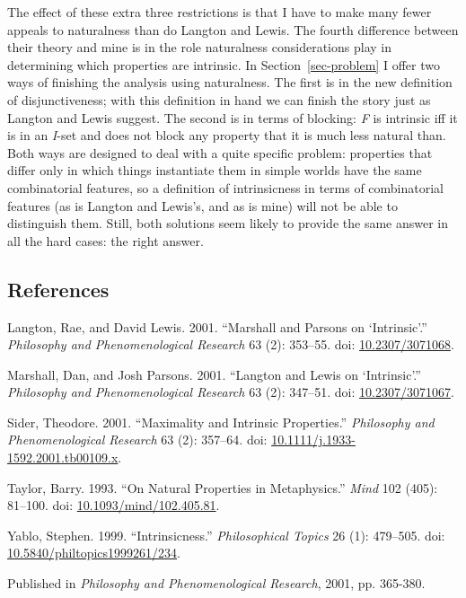 \documentclass[
  11pt,
  letterpaper,
  DIV=11,
  numbers=noendperiod,
  twoside]{scrartcl}
\newlength{\cslhangindent}
\newenvironment{CSLReferences}[2] %
 {\begin{list}{}{%
  \setlength{\itemindent}{0pt}
  \setlength{\leftmargin}{0pt}
  \setlength{\parsep}{0pt}
  \ifodd #1
   \setlength{\leftmargin}{\cslhangindent}
   \setlength{\itemindent}{-1\cslhangindent}
  \fi
  \setlength{\itemsep}{#2\baselineskip}}}
 {\end{list}}
\begin{document}
The effect of these extra three restrictions is that I have to make many
fewer appeals to naturalness than do Langton and Lewis. The fourth
difference between their theory and mine is in the role naturalness
considerations play in determining which properties are intrinsic. In
Section~\ref{sec-problem} I offer two ways of finishing the analysis
using naturalness. The first is in the new definition of
disjunctiveness; with this definition in hand we can finish the story
just as Langton and Lewis suggest. The second is in terms of blocking:
\emph{F} is intrinsic iff it is in an \emph{I}-set and does not block
any property that it is much less natural than. Both ways are designed
to deal with a quite specific problem: properties that differ only in
which things instantiate them in simple worlds have the same
combinatorial features, so a definition of intrinsicness in terms of
combinatorial features (as is Langton and Lewis's, and as is mine) will
not be able to distinguish them. Still, both solutions seem likely to
provide the same answer in all the hard cases: the right answer.

\subsection*{References}\label{references}

\label{refs}
\begin{CSLReferences}{1}{0}
Langton, Rae, and David Lewis. 2001. {``Marshall and {P}arsons on
{`Intrinsic'}.''} \emph{Philosophy and Phenomenological Research} 63
(2): 353--55. doi:
\href{https://doi.org/10.2307/3071068}{10.2307/3071068}.

Marshall, Dan, and Josh Parsons. 2001. {``Langton and Lewis on
{`Intrinsic'}.''} \emph{Philosophy and Phenomenological Research} 63
(2): 347--51. doi:
\href{https://doi.org/10.2307/3071067}{10.2307/3071067}.

Sider, Theodore. 2001. {``Maximality and Intrinsic Properties.''}
\emph{Philosophy and Phenomenological Research} 63 (2): 357--64. doi:
\href{https://doi.org/10.1111/j.1933-1592.2001.tb00109.x}{10.1111/j.1933-1592.2001.tb00109.x}.

Taylor, Barry. 1993. {``On Natural Properties in Metaphysics.''}
\emph{Mind} 102 (405): 81--100. doi:
\href{https://doi.org/10.1093/mind/102.405.81}{10.1093/mind/102.405.81}.

Yablo, Stephen. 1999. {``Intrinsicness.''} \emph{Philosophical Topics}
26 (1): 479--505. doi:
\href{https://doi.org/10.5840/philtopics1999261/234}{10.5840/philtopics1999261/234}.

\end{CSLReferences}



\noindent Published in\emph{
Philosophy and Phenomenological Research}, 2001, pp. 365-380.
\end{document}
